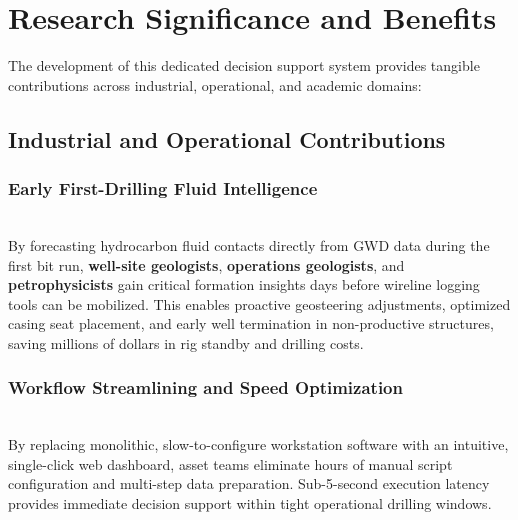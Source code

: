 \section{Research Significance and Benefits}

The development of this dedicated decision support system provides tangible contributions across industrial, operational, and academic domains:

\subsection{Industrial and Operational Contributions}

\subsubsection{Early First-Drilling Fluid Intelligence}~\\
By forecasting hydrocarbon fluid contacts directly from GWD data during the first bit run, \textbf{well-site geologists}, \textbf{operations geologists}, and \textbf{petrophysicists} gain critical formation insights days before wireline logging tools can be mobilized. This enables proactive geosteering adjustments, optimized casing seat placement, and early well termination in non-productive structures, saving millions of dollars in rig standby and drilling costs.

\subsubsection{Workflow Streamlining and Speed Optimization}~\\
By replacing monolithic, slow-to-configure workstation software with an intuitive, single-click web dashboard, asset teams eliminate hours of manual script configuration and multi-step data preparation. Sub-5-second execution latency provides immediate decision support within tight operational drilling windows.

